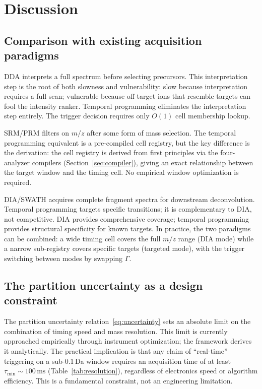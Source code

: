 \documentclass[twocolumn,10pt,a4paper]{article}
\theoremstyle{thmstyle}
\theoremstyle{definition}
\theoremstyle{remark}
\begin{document}
\section{Discussion}
\label{sec:discussion}

\subsection{Comparison with existing acquisition paradigms}

DDA interprets a full spectrum before selecting precursors. This
interpretation step is the root of both slowness and vulnerability:
slow because interpretation requires a full scan; vulnerable because
off-target ions that resemble targets can fool the intensity ranker.
Temporal programming eliminates the interpretation step entirely.
The trigger decision requires only $O(1)$ cell membership lookup.

SRM/PRM filters on $m/z$ after some form of mass selection. The
temporal programming equivalent is a pre-compiled cell registry,
but the key difference is the derivation: the cell registry is derived
from first principles via the four-analyzer compilers
(Section~\ref{sec:compiler}), giving an exact relationship between the
target window and the timing cell. No empirical window optimization
is required.

DIA/SWATH acquires complete fragment spectra for downstream
deconvolution. Temporal programming targets specific transitions;
it is complementary to DIA, not competitive. DIA provides comprehensive
coverage; temporal programming provides structural specificity for
known targets. In practice, the two paradigms can be combined:
a wide timing cell covers the full $m/z$ range (DIA mode) while a
narrow sub-registry covers specific targets (targeted mode),
with the trigger switching between modes by swapping $\Gamma$.

\subsection{The partition uncertainty as a design constraint}

The partition uncertainty relation~\eqref{eq:uncertainty} sets an
absolute limit on the combination of timing speed and mass resolution.
This limit is currently approached empirically through instrument
optimization; the framework derives it analytically. The practical
implication is that any claim of ``real-time'' triggering on a
sub-0.1\,Da window requires an acquisition time of at least
$\tau_{\min} \sim 100\,\mathrm{ms}$ (Table~\ref{tab:resolution}),
regardless of electronics speed or algorithm efficiency. This is a
fundamental constraint, not an engineering limitation.
\end{document}
